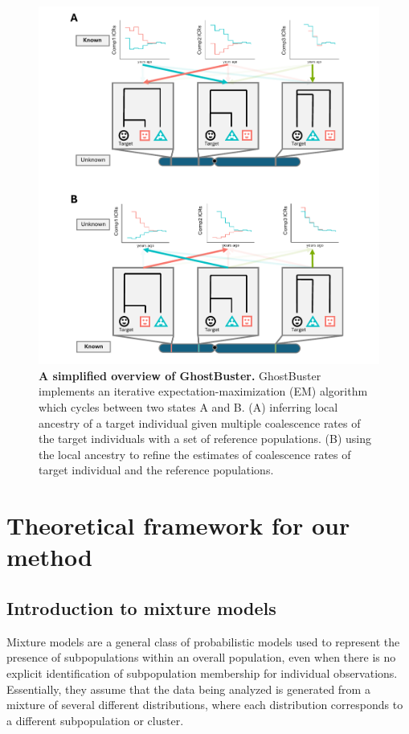 \begin{figure}[h!]
    \centering
    \includegraphics[width=\textwidth]{figures/thesis_gb_simplified_overview.pdf}
    \caption{\textbf{A simplified overview of GhostBuster.} GhostBuster implements an iterative expectation-maximization (EM) algorithm which cycles between two states A and B. (A) inferring local ancestry of a target individual given multiple coalescence rates of the target individuals with a set of reference populations. (B) using the local ancestry to refine the estimates of coalescence rates of target individual and the reference populations.}
    \label{fig:gb-simplified-overview}
\end{figure}

\section{Theoretical framework for our method}
\label{sec:ch2-gb-theory}

\subsection{Introduction to mixture models}

Mixture models are a general class of probabilistic models used to represent the presence of subpopulations within an overall population, even when there is no explicit identification of subpopulation membership for individual observations. Essentially, they assume that the data being analyzed is generated from a mixture of several different distributions, where each distribution corresponds to a different subpopulation or cluster. 

